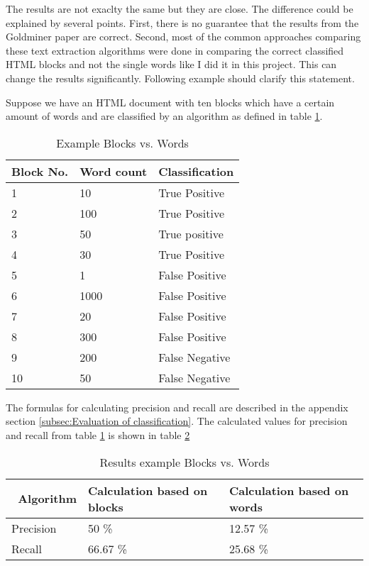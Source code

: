 The results are not exaclty the same but they are close. The difference could be explained by several points. First, there is no guarantee that the results from the Goldminer paper are correct. Second, most of the common approaches comparing these text extraction algorithms were done in comparing the correct classified HTML blocks and not the single words like I did it in this project. This can change the results significantly. Following example should clarify this statement.

Suppose we have an HTML document with ten blocks which have a certain amount of words and are classified by an algorithm as defined in table \ref{blockWordExample}.

\begin{table}[!ht]
\begin{tabular}{| p{2cm} | p{3cm} | p{3cm} | }
    \hline
    \textbf{Block No.}      & \textbf{Word count}  & \textbf{Classification} 				\\ \hline
    1     & 10      	&  True Positive	\\ \hline
    2     & 100     	&  True Positive	\\ \hline
    3     & 50       	&  True positive	\\ \hline
    4     & 30       	&  True Positive	\\ \hline
    5     & 1       	&  False Positive	\\ \hline
    6     & 1000      	&  False Positive	\\ \hline
    7     & 20      	&  False Positive	\\ \hline
    8     & 300       	&  False Positive	\\ \hline
    9     & 200       	&  False Negative	\\ \hline
    10    & 50        	&  False Negative	\\ \hline
\end{tabular}
\caption{Example Blocks vs. Words}
\label{blockWordExample}
\end{table}

The formulas for calculating precision and recall are described in the appendix section \ref{subsec:Evaluation of classification}.
The calculated values for precision and recall from table \ref{blockWordExample} is shown in table \ref{ResultsBlockWordExample}

\begin{table}[!ht]
\begin{tabular}{| p{3cm} | p{5cm} | p{5cm} | }
    \hline
    \ \textbf{Algorithm}  & \textbf{Calculation based on blocks}  & \textbf{Calculation based on words} 				\\ \hline
    Precision     & 50 \%    	&  12.57 \%	\\ \hline
    Recall & 66.67 \%    	&  25.68 \%	\\ \hline
\end{tabular}
\caption{Results example Blocks vs. Words}
\label{ResultsBlockWordExample}
\end{table}


